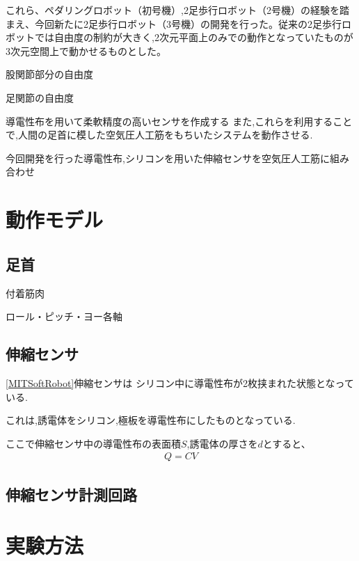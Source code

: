 これら、ペダリングロボット（初号機）,2足歩行ロボット（2号機）の経験を踏まえ、今回新たに2足歩行ロボット（3号機）の開発を行った。従来の2足歩行ロボットでは自由度の制約が大きく,2次元平面上のみでの動作となっていたものが3次元空間上で動かせるものとした。

股関節部分の自由度

足関節の自由度

導電性布を用いて柔軟精度の高いセンサを作成する
また,これらを利用することで,人間の足首に模した空気圧人工筋をもちいたシステムを動作させる.

今回開発を行った導電性布,シリコンを用いた伸縮センサを空気圧人工筋に組み合わせ
\section{動作モデル}
\subsection{足首}
付着筋肉

ロール・ピッチ・ヨー各軸
\subsection{伸縮センサ}
\ref{MITSoftRobot}伸縮センサは
シリコン中に導電性布が2枚挟まれた状態となっている.

これは,誘電体をシリコン,極板を導電性布にしたものとなっている.

ここで伸縮センサ中の導電性布の表面積$S$,誘電体の厚さを$d$とすると、
\begin{eqnarray}
    Q=CV
\end{eqnarray}
\subsection{伸縮センサ計測回路}
\section{実験方法}
